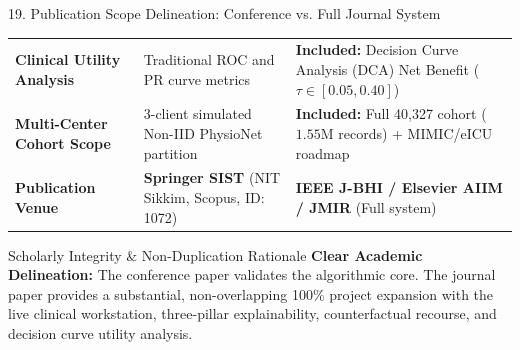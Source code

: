 \documentclass[aspectratio=169, 10pt]{beamer}
\begin{document}
\begin{frame}{19. Publication Scope Delineation: Conference vs. Full Journal System}
\begin{table}
{\begin{tabular}{l p{5.5cm} p{6.2cm}}
            \textbf{Clinical Utility Analysis} & Traditional ROC and PR curve metrics & \textbf{Included:} Decision Curve Analysis (DCA) Net Benefit ($\tau \in [0.05, 0.40]$) \\
            \textbf{Multi-Center Cohort Scope} & 3-client simulated Non-IID PhysioNet partition & \textbf{Included:} Full 40,327 cohort ($1.55\text{M}$ records) + MIMIC/eICU roadmap \\
            \textbf{Publication Venue} & \textbf{Springer SIST} (NIT Sikkim, Scopus, ID: 1072) & \textbf{IEEE J-BHI / Elsevier AIIM / JMIR} (Full system) \\
            \bottomrule
        \end{tabular}%
        }
    \end{table}
    \vspace{0.06cm}
    \begin{exampleblock}{\scriptsize Scholarly Integrity \& Non-Duplication Rationale}
        \scriptsize
        \textbf{Clear Academic Delineation:} The conference paper validates the algorithmic core. The journal paper provides a substantial, non-overlapping 100\% project expansion with the live clinical workstation, three-pillar explainability, counterfactual recourse, and decision curve utility analysis.
    \end{exampleblock}
\end{frame}
\end{document}
